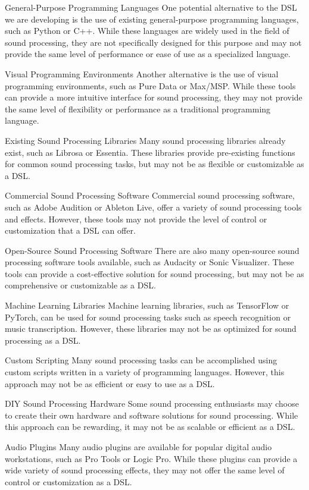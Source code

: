 General-Purpose Programming Languages
One potential alternative to the DSL we are developing is the use of existing general-purpose programming languages, such as Python or C++. While these languages are widely used in the field of sound processing, they are not specifically designed for this purpose and may not provide the same level of performance or ease of use as a specialized language.

Visual Programming Environments
Another alternative is the use of visual programming environments, such as Pure Data or Max/MSP. While these tools can provide a more intuitive interface for sound processing, they may not provide the same level of flexibility or performance as a traditional programming language.

Existing Sound Processing Libraries
Many sound processing libraries already exist, such as Librosa or Essentia. These libraries provide pre-existing functions for common sound processing tasks, but may not be as flexible or customizable as a DSL.

Commercial Sound Processing Software
Commercial sound processing software, such as Adobe Audition or Ableton Live, offer a variety of sound processing tools and effects. However, these tools may not provide the level of control or customization that a DSL can offer.

Open-Source Sound Processing Software
There are also many open-source sound processing software tools available, such as Audacity or Sonic Visualizer. These tools can provide a cost-effective solution for sound processing, but may not be as comprehensive or customizable as a DSL.

Machine Learning Libraries
Machine learning libraries, such as TensorFlow or PyTorch, can be used for sound processing tasks such as speech recognition or music transcription. However, these libraries may not be as optimized for sound processing as a DSL.

Custom Scripting
Many sound processing tasks can be accomplished using custom scripts written in a variety of programming languages. However, this approach may not be as efficient or easy to use as a DSL.

DIY Sound Processing Hardware
Some sound processing enthusiasts may choose to create their own hardware and software solutions for sound processing. While this approach can be rewarding, it may not be as scalable or efficient as a DSL.

Audio Plugins
Many audio plugins are available for popular digital audio workstations, such as Pro Tools or Logic Pro. While these plugins can provide a wide variety of sound processing effects, they may not offer the same level of control or customization as a DSL.

